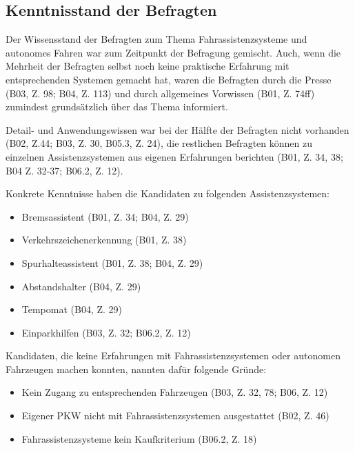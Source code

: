 \documentclass[12pt]{article}
\begin{document}
%
%

\subsection{Kenntnisstand der Befragten}
Der Wissensstand der Befragten zum Thema Fahrassistenzsysteme und autonomes Fahren war zum Zeitpunkt der Befragung gemischt. Auch, wenn die Mehrheit der Befragten selbst noch keine praktische Erfahrung mit entsprechenden Systemen gemacht hat, waren die Befragten durch die Presse (B03, Z. 98; B04, Z. 113) und durch allgemeines Vorwissen (B01, Z. 74ff) zumindest grundsätzlich über das Thema informiert.

Detail- und Anwendungswissen war bei der Hälfte der Befragten nicht vorhanden (B02, Z.44; B03, Z. 30, B05.3, Z. 24), die restlichen Befragten können  zu einzelnen Assistenzsystemen aus eigenen Erfahrungen berichten (B01, Z. 34, 38; B04 Z. 32-37; B06.2, Z. 12).

Konkrete Kenntnisse haben die Kandidaten zu folgenden Assistenzsystemen:
\begin{itemize}
  \item Bremsassistent (B01, Z. 34; B04, Z. 29)
  \item Verkehrszeichenerkennung (B01, Z. 38)
  \item Spurhalteassistent (B01, Z. 38; B04, Z. 29)
  \item Abstandshalter (B04, Z. 29)
  \item Tempomat (B04, Z. 29)
  \item Einparkhilfen (B03, Z. 32; B06.2, Z. 12)
\end{itemize}

Kandidaten, die keine Erfahrungen mit Fahrassistenzsystemen oder autonomen Fahrzeugen machen konnten, nannten dafür folgende Gründe:
\begin{itemize}
  \item Kein Zugang zu entsprechenden Fahrzeugen (B03, Z. 32, 78; B06, Z. 12)
  \item Eigener PKW nicht mit Fahrassistenzsystemen ausgestattet (B02, Z. 46)
  \item Fahrassistenzsysteme kein Kaufkriterium (B06.2, Z. 18)
\end{itemize}
\end{document}
